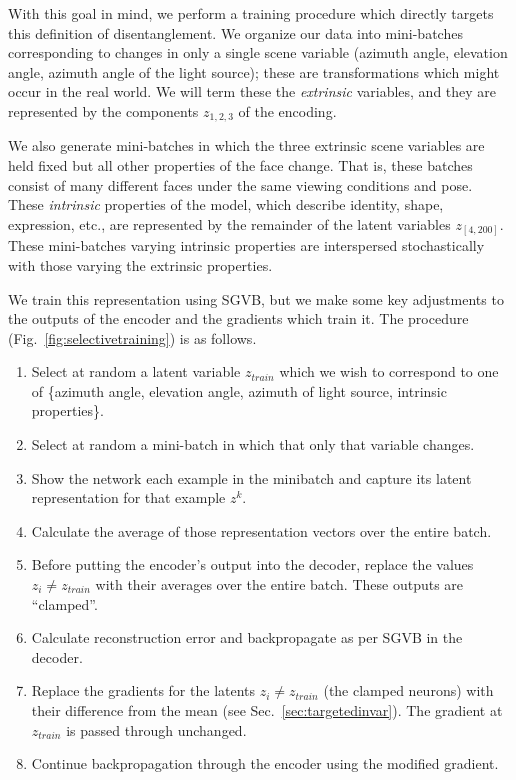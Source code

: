 \documentclass[12pt,twoside]{mitthesis}
\providecommand{\tightlist}{%
  \setlength{\itemsep}{0pt}\setlength{\parskip}{0pt}}
\begin{document}
With this goal in mind, we perform a training procedure which directly
targets this definition of disentanglement. We organize our data into
mini-batches corresponding to changes in only a single scene variable
(azimuth angle, elevation angle, azimuth angle of the light source);
these are transformations which might occur in the real world. We will
term these the \emph{extrinsic} variables, and they are represented by
the components $z_{1,2,3}$ of the encoding.

We also generate mini-batches in which the three extrinsic scene
variables are held fixed but all other properties of the face change.
That is, these batches consist of many different faces under the same
viewing conditions and pose. These \emph{intrinsic} properties of the
model, which describe identity, shape, expression, etc., are represented
by the remainder of the latent variables $z_{[4,200]}$. These
mini-batches varying intrinsic properties are interspersed
stochastically with those varying the extrinsic properties.

We train this representation using SGVB, but we make some key
adjustments to the outputs of the encoder and the gradients which train
it. The procedure (Fig.~\ref{fig:selectivetraining}) is as follows.

\begin{enumerate}
\def\labelenumi{\arabic{enumi}.}
\tightlist
\item
  Select at random a latent variable $z_{train}$ which we wish to
  correspond to one of \{azimuth angle, elevation angle, azimuth of
  light source, intrinsic properties\}.
\item
  Select at random a mini-batch in which that only that variable
  changes.
\item
  Show the network each example in the minibatch and capture its latent
  representation for that example $z^k$.
\item
  Calculate the average of those representation vectors over the entire
  batch.
\item
  Before putting the encoder's output into the decoder, replace the
  values $z_i \neq z_{train}$ with their averages over the entire
  batch. These outputs are ``clamped''.
\item
  Calculate reconstruction error and backpropagate as per SGVB in the
  decoder.
\item
  Replace the gradients for the latents $z_i \neq z_{train}$ (the
  clamped neurons) with their difference from the mean (see
  Sec.~\ref{sec:targetedinvar}). The gradient at $z_{train}$ is passed
  through unchanged.
\item
  Continue backpropagation through the encoder using the modified
  gradient.
\end{enumerate}
\end{document}
